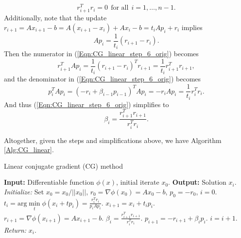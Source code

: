 \begin{enumerate}
\begin{equation}
r_{i+1}^Tr_i = 0 \ \ \text{for all} \ \  i = 1, \ldots, n-1.  
\end{equation}
Additionally, note that the update $r_{i+1} = Ax_{i+1} - b = A(x_{i+1} - x_i) + Ax_i - b = t_i Ap_i + r_i$ implies
\begin{equation} 				\label{Eqn:CG_linear_step_3_sub2}
Ap_i = \frac{1}{t_i}(r_{i+1} - r_i).
\end{equation}
Then the numerator in (\ref{Eqn:CG_linear_step_6_orig}) becomes
\begin{equation} 	\label{Eqn:CG_linear_step_3_sub3}
r_{i+1}^TAp_i = \frac{1}{t_i}(r_{i+1} - r_i)^T r_{i+1} = \frac{1}{t_i}r_{i+1}^Tr_{i+1},
\end{equation}
and the denominator in (\ref{Eqn:CG_linear_step_6_orig}) becomes
\begin{equation} 	\label{Eqn:CG_linear_step_3_sub4}
p_i^TAp_i = (-r_i + \beta_{i-1}p_{i-1})^TAp_i = -r_iAp_i = \frac{1}{t_i}r_i^Tr_i.
\end{equation}
And thus (\ref{Eqn:CG_linear_step_6_orig}) simplifies to
\begin{equation}			\label{Eqn:CG_linear_step_6_in_algo}
\beta_i = \frac{r_{i+1}^Tr_{i+1}}{r_i^Tr_i}.
\end{equation}



Altogether, given the steps and simplifications above, we have Algorithm \ref{Alg:CG_linear}.
\begin{algorithm}[H]
\caption{Linear conjugate gradient (CG) method}	\label{Alg:CG_linear}

\begin{algorithmic}[1]
	\Statex		\textbf{Input:} Differentiable function $\phi(x)$, initial iterate $x_0$.
	\Statex 	\textbf{Output:} Solution $x_i$.
	\State		\textit{Initialize:} Set $x_0 = x_0 / ||x_0||$, $r_0 = \nabla \phi (x_0) = Ax_0 - b$, $p_0 = -r_0$, $i = 0$.
		\State	$t_i = \text{arg}\min\limits_{\substack{t}} \phi(x_i + t p_i) = \frac{r_i^Tr_i}{p_iAp_i}$.
		\State	$x_{i+1} = x_i + t_i p_i$.
		\State	$r_{i+1} = \nabla \phi(x_{i+1}) = Ax_{i+1} - b$.
		\State	$\beta_i = \frac{r_{i+1}^Tr_{i+1}}{r_i^Tr_i}$.
		\State	$p_{i+1} = -r_{i+1} + \beta_ip_i$.
		\State 	$i = i + 1$.
	\EndWhile
	\State		\textit{Return:} $x_i$.
\end{algorithmic}

\end{algorithm}




\end{enumerate}
